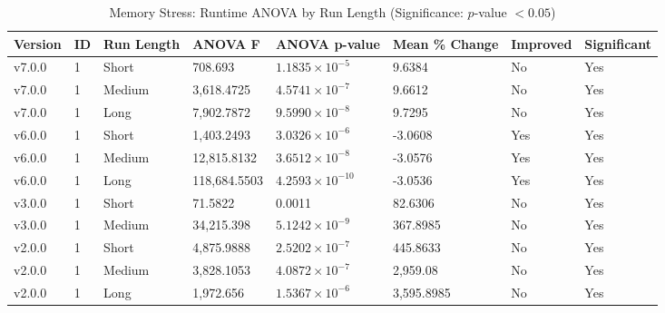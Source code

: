 \begin{table}[H]\caption{Memory Stress: Runtime ANOVA by Run Length (Significance: $p$-value $<0.05$)}
\centering\footnotesize\setlength{\tabcolsep}{4pt}\renewcommand{\arraystretch}{1.15}
\begin{tabular}{llllllll}
\toprule
Version & ID & Run Length & ANOVA F & ANOVA p-value & Mean \% Change & Improved & Significant \\ \midrule
v7.0.0 & 1 & Short & 708.693 & $1.1835\times10^{-5}$ & 9.6384 & No & Yes \\
v7.0.0 & 1 & Medium & 3,618.4725 & $4.5741\times10^{-7}$ & 9.6612 & No & Yes \\
v7.0.0 & 1 & Long & 7,902.7872 & $9.5990\times10^{-8}$ & 9.7295 & No & Yes \\
v6.0.0 & 1 & Short & 1,403.2493 & $3.0326\times10^{-6}$ & -3.0608 & Yes & Yes \\
v6.0.0 & 1 & Medium & 12,815.8132 & $3.6512\times10^{-8}$ & -3.0576 & Yes & Yes \\
v6.0.0 & 1 & Long & 118,684.5503 & $4.2593\times10^{-10}$ & -3.0536 & Yes & Yes \\
v3.0.0 & 1 & Short & 71.5822 & 0.0011 & 82.6306 & No & Yes \\
v3.0.0 & 1 & Medium & 34,215.398 & $5.1242\times10^{-9}$ & 367.8985 & No & Yes \\
v2.0.0 & 1 & Short & 4,875.9888 & $2.5202\times10^{-7}$ & 445.8633 & No & Yes \\
v2.0.0 & 1 & Medium & 3,828.1053 & $4.0872\times10^{-7}$ & 2,959.08 & No & Yes \\
v2.0.0 & 1 & Long & 1,972.656 & $1.5367\times10^{-6}$ & 3,595.8985 & No & Yes \\
\bottomrule\end{tabular}
\label{AnovaMemoryStress}
\par\smallskip\parbox{0.95\textwidth}{\scriptsize}
\end{table}

